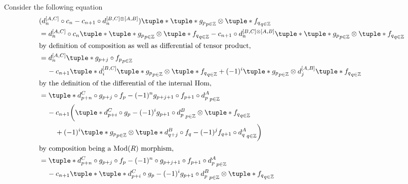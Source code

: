 \begin{remark}
\begin{enumerate}
{            Consider the following equation
            \begin{align*}
                &( d_n^{[A, C]} \circ c_n - c_{n + 1} \circ d_n^{[B, C] \otimes [A, B]} )\tuple*{ \tuple*{ g_p }_{p \in \Zb} \otimes \tuple*{ f_q }_{q \in \Zb} } \\
                &= d_n^{[A, C]} \circ c_n \tuple*{ \tuple*{ g_p }_{p \in \Zb} \otimes \tuple*{ f_q }_{q \in \Zb} } - c_{n + 1} \circ d_n^{[B, C] \otimes [A, B]}\tuple*{ \tuple*{ g_p }_{p \in \Zb} \otimes \tuple*{ f_q }_{q \in \Zb} } \\
                \intertext{by definition of composition as well as differential of tensor product,}
                &= d_n^{[A, C]}\tuple*{ g_{p + j} \circ f_p }_{p \in \Zb} \\
                &\hspace{0.4cm} - c_{n + 1} \tuple*{
                    d_i^{[B, C]} \tuple*{ g_p }_{p \in \Zb} \otimes \tuple*{ f_q }_{q \in \Zb}
                    + (-1)^i \tuple*{ g_p }_{p \in \Zb} \otimes d_j^{[A, B]} \tuple*{ f_q }_{q \in \Zb}
                } \\
                \intertext{by the definition of the differential of the internal Hom,}
                &= \tuple*{
                    d_{p + n}^C \circ g_{p + j} \circ f_p - (-1)^n g_{p + j + 1} \circ f_{p + 1} \circ d_p^A
                }_{p \in \Zb} \\
                &\hspace{0.4cm} - c_{n + 1} \bigg(
                    \tuple*{
                        d_{p + i}^C \circ g_p - (-1)^i g_{p + 1} \circ d_p^B
                    }_{p \in \Zb} \otimes \tuple*{ f_q }_{q \in \Zb} \\
                    &\hspace{0.8cm}+ (-1)^i \tuple*{ g_p }_{p \in \Zb} \otimes \tuple*{
                        d_{q + j}^B \circ f_q - (-1)^j f_{q + 1} \circ d_q^A
                    }_{q \in \Zb}
                \bigg) \\
                \intertext{by composition being a \( \Mod(R) \) morphism,}
                &= \tuple*{
                    d_{p + n}^C \circ g_{p + j} \circ f_p - (-1)^n \circ g_{p + j + 1} \circ f_{p + 1} \circ d_p^A
                }_{p \in \Zb} \\
                &\hspace{0.4cm} - c_{n + 1} \tuple*{
                    \tuple*{
                        d_{p + i}^C \circ g_p - (-1)^i g_{p + 1} \circ d_p^B
                    }_{p \in \Zb} \otimes \tuple*{ f_q }_{q \in \Zb}
}
\end{align*}}
\end{enumerate}
\end{remark}
